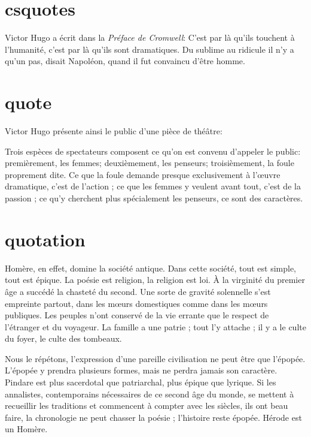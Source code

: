 \documentclass{book}
\begin{document}
\section{csquotes}

Victor Hugo a écrit dans la \emph{Préface de Cromwell}: C’est par là qu’ils   touchent à l’humanité, c’est par là qu’ils sont dramatiques. Du sublime au ridicule il n’y a qu’un pas, disait Napoléon, quand il fut convaincu d’être homme.


\section{quote}


Victor Hugo présente ainsi le public d'une pièce de théâtre:

Trois espèces de spectateurs composent ce qu’on est convenu d’appeler le public: premièrement, les femmes; deuxièmement, les penseurs; troisièmement, la foule proprement dite. Ce que la foule demande presque exclusivement à l’œuvre dramatique, c’est de l’action ; ce que les femmes y veulent avant tout, c’est de la passion ; ce qu’y cherchent plus spécialement les penseurs, ce sont des caractères.


\section{quotation}

Homère, en effet, domine la société antique. Dans cette société, tout est simple, tout est épique. La poésie est religion, la religion est loi. À la virginité du premier âge a succédé la chasteté du second. Une sorte de gravité solennelle s’est empreinte partout, dans les mœurs domestiques comme dans les mœurs publiques. Les peuples n’ont conservé de la vie errante que le respect de l’étranger et du voyageur. La famille a une patrie ; tout l’y attache ; il y a le culte du foyer, le culte des tombeaux.

Nous le répétons, l’expression d’une pareille civilisation ne peut être que l’épopée. L’épopée y prendra plusieurs formes, mais ne perdra jamais son caractère. Pindare est plus sacerdotal que patriarchal, plus épique que lyrique. Si les annalistes, contemporains nécessaires de ce second âge du monde, se mettent à recueillir les traditions et commencent à compter avec les siècles, ils ont beau faire, la chronologie ne peut chasser la poésie ; l’histoire reste épopée. Hérode est un Homère.
\end{document}
